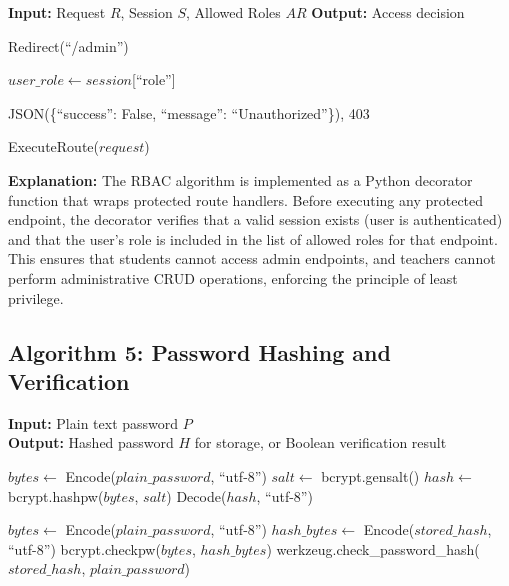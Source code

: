 \begin{algorithm}[H]
\caption{Role-Based Access Control}
\begin{algorithmic}[1]

\State \textbf{Input:} Request $R$, Session $S$, Allowed Roles $AR$
\State \textbf{Output:} Access decision

        \State \Return Redirect(``/admin'') 
    \EndIf
    
    \State $user\_role \gets session$[``role'']
    
        \State \Return JSON(\{``success'': False, ``message'': ``Unauthorized''\}), 403
    \EndIf
    
    \State \Return ExecuteRoute($request$) 
\EndFunction

\end{algorithmic}
\end{algorithm}

\textbf{Explanation:}
The RBAC algorithm is implemented as a Python decorator function that wraps protected route handlers. Before executing any protected endpoint, the decorator verifies that a valid session exists (user is authenticated) and that the user's role is included in the list of allowed roles for that endpoint. This ensures that students cannot access admin endpoints, and teachers cannot perform administrative CRUD operations, enforcing the principle of least privilege.


\subsection{Algorithm 5: Password Hashing and Verification}

\textbf{Input:} Plain text password $P$ \\
\textbf{Output:} Hashed password $H$ for storage, or Boolean verification result

\begin{algorithm}[H]
\caption{Password Hashing and Verification}
\begin{algorithmic}[1]

    \State $bytes \gets$ Encode($plain\_password$, ``utf-8'')
    \State $salt \gets$ bcrypt.gensalt()
    \State $hash \gets$ bcrypt.hashpw($bytes$, $salt$)
    \State \Return Decode($hash$, ``utf-8'')
\EndFunction


        \State $bytes \gets$ Encode($plain\_password$, ``utf-8'')
        \State $hash\_bytes \gets$ Encode($stored\_hash$, ``utf-8'')
        \State \Return bcrypt.checkpw($bytes$, $hash\_bytes$)
    \Else
        \State \Return werkzeug.check\_password\_hash($stored\_hash$, $plain\_password$)
    \EndIf
\EndFunction

\end{algorithmic}
\end{algorithm}

